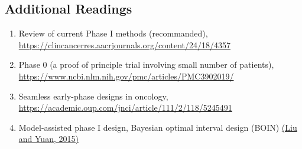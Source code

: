 \documentclass[
]{article}
\providecommand{\tightlist}{%
  \setlength{\itemsep}{0pt}\setlength{\parskip}{0pt}}
\begin{document}
\hypertarget{additional-readings}{%
\subsection{Additional Readings}\label{additional-readings}}

\begin{enumerate}
\def\labelenumi{\arabic{enumi}.}
\setcounter{enumi}{-1}
\tightlist
\item
  Review of current Phase I methods (recommanded),
  \url{https://clincancerres.aacrjournals.org/content/24/18/4357}
\item
  Phase 0 (a proof of principle trial involving small number of
  patients), \url{https://www.ncbi.nlm.nih.gov/pmc/articles/PMC3902019/}
\item
  Seamless early-phase designs in oncology,
  \url{https://academic.oup.com/jnci/article/111/2/118/5245491}
\item
  Model-assisted phase I design, Bayesian optimal interval design (BOIN)
  \href{https://doi.org/10.1111/rssc.12089}{(Liu and Yuan, 2015)}
\end{enumerate}
\end{document}
